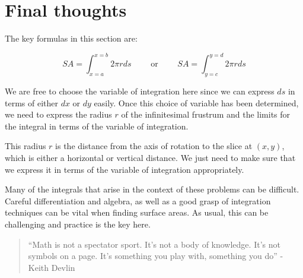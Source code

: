 \documentclass{ximera}
\begin{document}
%    
%    


\section{Final thoughts}
The key formulas in this section are:

\[
SA=\int_{x=a}^{x=b} 2 \pi r ds \qquad \textrm{ or }  \qquad SA=\int_{y=c}^{y=d} 2 \pi r ds
\]

We are free to choose the variable of integration here since we can express $ds$ in terms of either $dx$ or $dy$ easily.  Once this choice of variable has been determined, we need to express the radius $r$ of the infinitesimal frustrum and the limits for the integral in terms of the variable of integration.  

This radius $r$ is the distance from the axis of rotation to the slice at $(x,y)$, which is either a horizontal or vertical distance.  We just need to make sure that we express it in terms of the variable of integration appropriately.

Many of the integrals that arise in the context of these problems can be difficult.  Careful differentiation and algebra, as well as a good grasp of integration techniques can be vital when finding surface areas.  As usual, this can be challenging and practice is the key here.

\begin{quote}
``Math is not a spectator sport.  It's not a body of knowledge.  It's not symbols on a page. It's something you play with, something you do'' - Keith Devlin
\end{quote}
\end{document}

